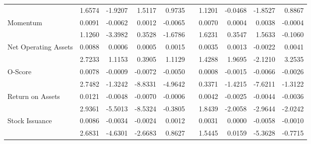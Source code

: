 \begin{table}[h]
{\begin{tabular}{lrrrrlrrrr}
            & 1.6574 & -1.9207 & 1.5117 & 0.9735 &       & 1.1201 & -0.0468 & -1.8527 & 0.8867 \\
      Momentum & 0.0091 & -0.0062 & 0.0012 & -0.0065 &       & 0.0070 & 0.0004 & 0.0038 & -0.0004 \\
            & 1.1260 & -3.3982 & 0.3528 & -1.6786 &       & 1.6231 & 0.3547 & 1.5633 & -0.1060 \\
      Net Operating Assets & 0.0088 & 0.0006 & 0.0005 & 0.0015 &       & 0.0035 & 0.0013 & -0.0022 & 0.0041 \\
            & 2.7233 & 1.1153 & 0.3905 & 1.1129 &       & 1.4288 & 1.9695 & -2.1210 & 3.2535 \\
      O-Score & 0.0078 & -0.0009 & -0.0072 & -0.0050 &       & 0.0008 & -0.0015 & -0.0066 & -0.0026 \\
            & 2.7482 & -1.3242 & -8.8331 & -4.9642 &       & 0.3371 & -1.4215 & -7.6211 & -1.3122 \\
      Return on Assets & 0.0121 & -0.0048 & -0.0070 & -0.0006 &       & 0.0042 & -0.0025 & -0.0044 & -0.0036 \\
            & 2.9361 & -5.5013 & -8.5324 & -0.3805 &       & 1.8439 & -2.0058 & -2.9644 & -2.0242 \\
      Stock Issuance & 0.0086 & -0.0034 & -0.0024 & 0.0012 &       & 0.0031 & 0.0000 & -0.0058 & -0.0010 \\
            & 2.6831 & -4.6301 & -2.6683 & 0.8627 &       & 1.5445 & 0.0159 & -5.3628 & -0.7715 \\
      \bottomrule
      \end{tabular}%
    }
    \label{tab:vol-ff3}%
  \end{table}%
  
